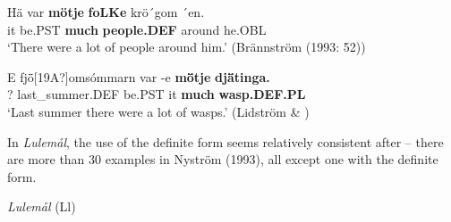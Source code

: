 

\item 


 \ea\label{}
\gll Hä  var  \textbf{mö{\textasciigrave}tje}\textbf{  foLKe} krö´gom  ´en.\\


it  be.PST  \textbf{much} \textbf{people.DEF} around  he.OBL\\

\glt ‘There were a lot of people around him.’ (Brännström (1993: 52))

\z

\item 


 \ea\label{}
\gll E  fj\={ö}[19A?]omsómmarn  var  {}-e  \textbf{m\={ö}tje}\textbf{  dj\={ä}tinga.}\\


?  last\_summer.DEF  be.PST  it  \textbf{much} \textbf{wasp.DEF.PL}\\

\glt ‘Last summer there were a lot of wasps.’ (Lidström \& \citet[93]{Berglund1991})

\z

In \textit{Lulemål}, the use of the definite form seems relatively consistent after  – there are more than 30 examples in Nyström (1993), all except one with the definite form. 


\item 

\textit{Lulemål }(Ll)



